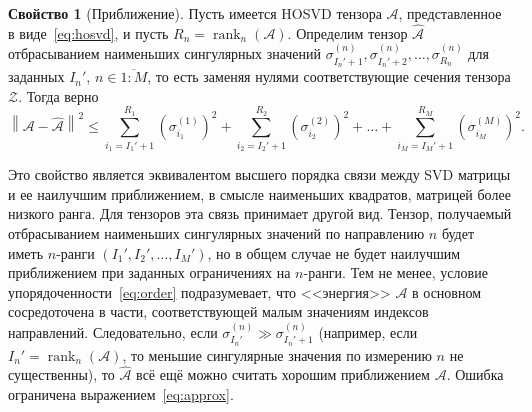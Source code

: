 \documentclass[specialist,
  substylefile=spbu_report.rtx,
subf,href,colorlinks=true, 12pt]{disser}
\theoremstyle{plain}
\theoremstyle{definition}
\newtheorem{property}{Свойство}[section]
\theoremstyle{remark}
\begin{document}
\begin{property}[Приближение]
  \label{property:approx}
  Пусть имеется HOSVD тензора $\mathcal{A}$, представленное в
  виде~\eqref{eq:hosvd}, и пусть $R_n=\operatorname{rank}_n(\mathcal{A})$.
  Определим тензор $\widehat{\mathcal{A}}$ отбрасыванием наименьших
  сингулярных значений $\sigma_{I_{n}'+1}^{(n)},
  \sigma_{I_{n}'+2}^{(n)},\ldots, \sigma_{R_n}^{(n)}$
  для заданных $I_{n}'$, $n \in \overline{1:M}$, то есть заменяя
  нулями соответствующие сечения тензора $\mathcal{Z}$.
  Тогда верно
  \begin{equation}
    \left\|\mathcal{A}-\widehat{\mathcal{A}}\right\|^2\leqslant
    \sum_{i_1=I_{1}'+1}^{R_1}\left( \sigma_{i_1}^{(1)}\right)^2 +
    \sum_{i_2=I_{2}'+1}^{R_2}\left( \sigma_{i_2}^{(2)}\right)^2 +
    \ldots + \sum_{i_M=I_{M}'+1}^{R_M}\left(
    \sigma_{i_M}^{(M)}\right)^2.\label{eq:approx}
  \end{equation}
\end{property}

Это свойство является эквивалентом высшего порядка связи между SVD
матрицы и ее наилучшим приближением,
в смысле наименьших квадратов, матрицей более низкого ранга.
Для тензоров эта связь принимает другой вид.
Тензор, получаемый отбрасыванием наименьших сингулярных значений по
направлению $n$ будет иметь
$n$-ранги $(I_1', I_2', \ldots, I_M')$, но в общем случае не будет
наилучшим приближением при
заданных ограничениях на $n$-ранги.
Тем не менее, условие упорядоченности~\eqref{eq:order} подразумевает,
что <<энергия>> $\mathcal{A}$ в основном сосредоточена в части,
соответствующей малым значениям индексов направлений.
Следовательно, если $\sigma^{(n)}_{I_n'} \gg \sigma^{(n)}_{I_n'+1}$
(например, если $I_n'=\operatorname{rank}_n(\mathcal{A})$,
то меньшие сингулярные значения по измерению $n$ не существенны), то
$\widehat{\mathcal{A}}$ всё ещё можно считать хорошим приближением
$\mathcal{A}$.
Ошибка ограничена выражением~\eqref{eq:approx}.
\end{document}
